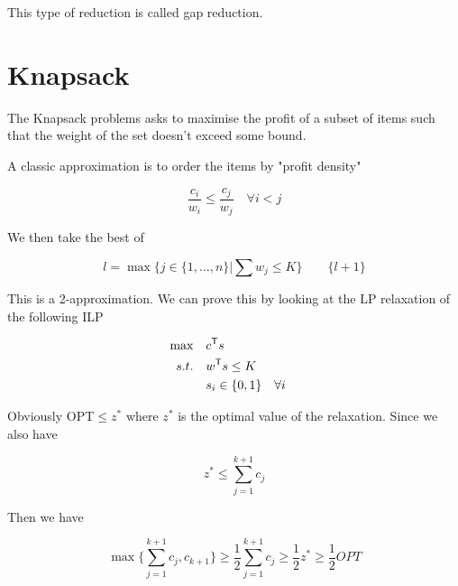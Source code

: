This type of reduction is called gap reduction.

\section{Knapsack}

The Knapsack problems asks to maximise the profit of a subset of items such that the weight of the set doesn't exceed some bound.

A classic approximation is to order the items by "profit density"

\[\frac{c_i}{w_i} \leq \frac{c_j}{w_j} \quad \forall i<j\]

We then take the best of

\[l = \max \{j\in \{1,\ldots, n\}| \sum w_j \leq K\} \qquad \{l+1\}\]

This is a 2-approximation. We can prove this by looking at the LP relaxation of the following ILP

\begin{align*}
\max \quad & {c}^\text{\upshape \sffamily T} s\\
s.t.\quad & {w}^\text{\upshape \sffamily T} s \leq K\\
	& s_i \in \{0,1\} && \forall i
\end{align*}

Obviously OPT$\leq z^*$ where $z^*$ is the optimal value of the relaxation. Since we also have

\[z^* \leq \sum_{j=1}^{k+1} c_j\]

Then we have

\[\max \{\sum_{j=1}^{k+1} c_j, c_{k+1}\} \geq \frac 12 \sum_{j=1}^{k+1} c_j \geq \frac 12 z^* \geq \frac 12 OPT\]